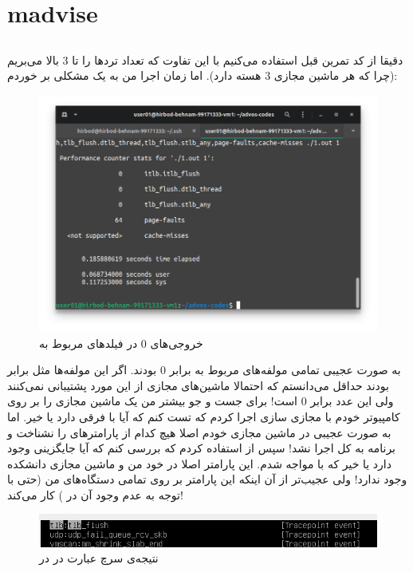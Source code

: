 \section{madvise}
\subsection{}
دقیقا از کد تمرین قبل استفاده می‌کنیم با این تفاوت که تعداد ترد‌ها را تا 3 بالا می‌بریم
(چرا که هر ماشین مجازی 3 هسته دارد).
اما زمان اجرا من به یک مشکلی بر خوردم:
\begin{figure}[H]
    \centering
    \includegraphics[scale=0.4]{pic/1-no-tlb.png}
    \caption{خروجی‌های 0 در فیلد‌های مربوط به }
\end{figure}
به صورت عجیبی تمامی مولفه‌های مربوط به
برابر 0 بودند. اگر این مولفه‌ها مثل
برابر
بودند حداقل می‌دانستم که احتمالا ماشین‌های مجازی از این مورد پشتیبانی نمی‌کنند ولی این عدد برابر 0 است!
برای جست و جو بیشتر من یک ماشین مجازی
را بر روی کامپیوتر خودم با مجازی سازی
اجرا کردم که تست کنم که آیا
 با 
فرقی دارد یا خیر. اما به صورت عجیبی در ماشین مجازی خودم اصلا
هیچ کدام از پارامتر‌های
را نشناخت و برنامه به کل اجرا نشد! سپس از
استفاده کردم که بررسی کنم که آیا جایگزینی وجود دارد یا خیر که با
مواجه شدم. این پارامتر اصلا در
خود من و ماشین مجازی دانشکده وجود ندارد! ولی عجیب‌تر از آن اینکه این پارامتر بر روی تمامی دستگاه‌های من
(حتی با توجه به عدم وجود آن در )
کار می‌کند! 
\begin{figure}[H]
    \centering
    \includegraphics[scale=0.7]{pic/1-tlb-debian.png}
    \caption{نتیجه‌ی سرچ عبارت  در  در }
\end{figure}
